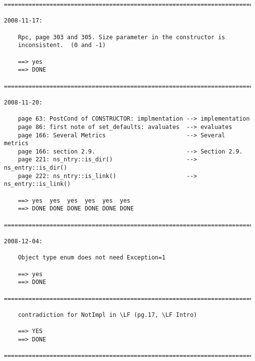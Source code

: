 \documentclass{article}
\begin{document}
\begin{verbatim}
=========================================================================

2008-11-17:

    Rpc, page 303 and 305. Size parameter in the constructor is
    inconsistent.  (0 and -1)

    ==> yes
    ==> DONE

=========================================================================

2008-11-20:

    page 63: PostCond of CONSTRUCTOR: implmentation --> implementation
    page 86: first note of set_defaults: avaluates  --> evaluates
    page 166: Several Metrics                       --> Several metrics
    page 166: section 2.9.                          --> Section 2.9.
    page 221: ns_ntry::is_dir()                     --> ns_entry::is_dir()
    page 222: ns_ntry::is_link()                    --> ns_entry::is_link()

    ==> yes  yes  yes  yes  yes  yes
    ==> DONE DONE DONE DONE DONE DONE

=========================================================================

2008-12-04:

    Object type enum does not need Exception=1

    ==> yes
    ==> DONE

=========================================================================

    contradiction for NotImpl in \LF (pg.17, \LF Intro)

    ==> YES
    ==> DONE
    
=========================================================================

    
\end{verbatim}
\end{document}
